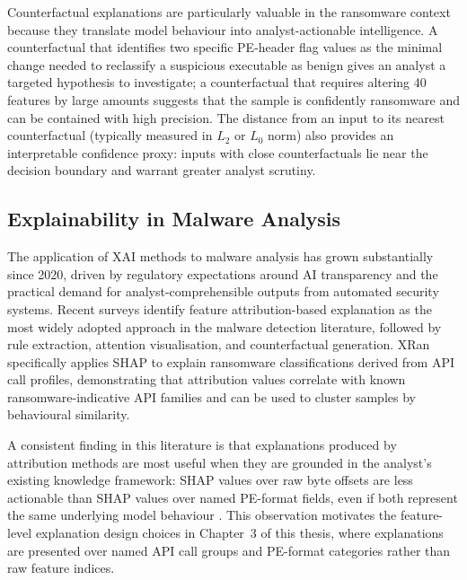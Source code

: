 Counterfactual explanations are particularly valuable in the ransomware context because they
translate model behaviour into analyst-actionable intelligence.
A counterfactual that identifies two specific PE-header flag values as the minimal change
needed to reclassify a suspicious executable as benign gives an analyst a targeted hypothesis
to investigate; a counterfactual that requires altering 40 features by large amounts suggests
that the sample is confidently ransomware and can be contained with high precision.
The distance from an input to its nearest counterfactual (typically measured in $L_2$ or
$L_0$ norm) also provides an interpretable confidence proxy: inputs with close counterfactuals
lie near the decision boundary and warrant greater analyst scrutiny.

\subsection{Explainability in Malware Analysis}
\label{sec:lit_xai_malware}

The application of XAI methods to malware analysis has grown substantially since 2020,
driven by regulatory expectations around AI transparency and the practical demand for
analyst-comprehensible outputs from automated security systems.
Recent surveys \cite{Ispahany2024Survey, yumlembam2024comprehensive} identify feature
attribution-based explanation as the most widely adopted approach in the malware detection
literature, followed by rule extraction, attention visualisation, and counterfactual generation.
XRan \cite{gulmez2024xran} specifically applies SHAP to explain ransomware classifications
derived from API call profiles, demonstrating that attribution values correlate with known
ransomware-indicative API families and can be used to cluster samples by behavioural similarity.

A consistent finding in this literature is that explanations produced by attribution methods
are most useful when they are grounded in the analyst's existing knowledge framework: SHAP
values over raw byte offsets are less actionable than SHAP values over named PE-format fields,
even if both represent the same underlying model behaviour \cite{lundberg2017shap, gulmez2024xran}.
This observation motivates the feature-level explanation design choices in Chapter~3 of this
thesis, where explanations are presented over named API call groups and PE-format categories
rather than raw feature indices.

